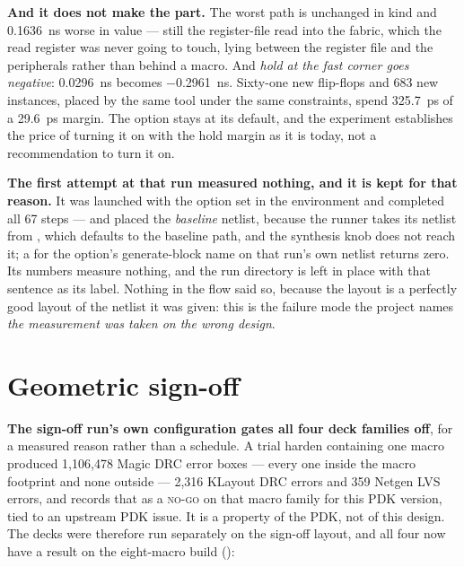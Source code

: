\textbf{And it does not make the part.} The worst path is unchanged in
kind and \qty{0.1636}{\nano\second} worse in value --- still the
register-file read into the fabric, which the read register was never
going to touch, lying between the register file and the peripherals
rather than behind a macro. And \emph{hold at the fast corner goes
negative}: \qty{+0.0296}{\nano\second} becomes
\qty{-0.2961}{\nano\second}. Sixty-one new flip-flops and 683 new
instances, placed by the same tool under the same constraints, spend
\qty{325.7}{\pico\second} of a \qty{29.6}{\pico\second} margin. The
option stays at its default, and the experiment establishes the price of
turning it on with the hold margin as it is today, not a recommendation
to turn it on.

\textbf{The first attempt at that run measured nothing, and it is kept
for that reason.} It was launched with the option set in the environment
and completed all 67 steps --- and placed the \emph{baseline} netlist,
because the runner takes its netlist from , which
defaults to the baseline path, and the synthesis knob does not reach it;
a  for the option's generate-block name on that run's own
netlist returns zero. Its numbers measure nothing, and the run directory
is left in place with that sentence as its label. Nothing in the flow
said so, because the layout is a perfectly good layout of the netlist it
was given: this is the failure mode the project names \emph{the
measurement was taken on the wrong design}.

\section{Geometric sign-off}
\label{sec:phys-decks}

\textbf{The sign-off run's own configuration gates all four deck
families off}, for a measured reason rather than a schedule. A trial
harden containing one  macro produced 1,106,478 Magic
DRC error boxes --- every one inside the macro footprint and none
outside --- 2,316 KLayout DRC errors and 359 Netgen LVS errors, and
 records that as a \textsc{no-go} on that macro
family for this PDK version, tied to an upstream PDK issue. It is a
property of the PDK, not of this design. The decks were therefore run
separately on the sign-off layout, and all four now have a result on the
eight-macro build ():

